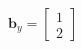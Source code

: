 \documentclass[preview]{standalone}
\begin{document}
\begin{align*}
\mathbf{b}_y = \begin{bmatrix} 1 \\ 2 \end{bmatrix}
\end{align*}
\end{document}
